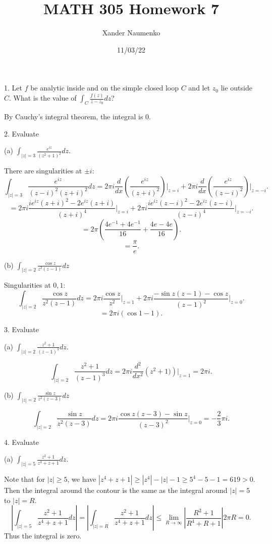 \documentclass[letterpaper, reqno,11pt]{article}
\begin{document}
\title{MATH 305 Homework 7}
\date{11/03/22}
\author{Xander Naumenko}
\maketitle

1. Let $ f$ be analytic inside and on the simple closed loop $C$ and let $z_0$ lie outside $C$. What is the value of $ \int_{C} \frac{f(z)}{ z-z_0 } dz $?

By Cauchy's integral theorem, the integral is $0$. 

\medskip


2. Evaluate

(a) $\int_{|z|=3} \frac{e^{iz}}{ (z^2+1)^2} dz$.   

There are singularities at $\pm i$: 
\[
\int_{|z|=3}\frac{e^{iz}}{(z-i)^2(z+i)^2}dz=2\pi i \frac{d}{dx}\left(\frac{e^{iz}}{(z+i)^2}\right)\bigg|_{z=i}+2\pi i \frac{d}{dx}\left(\frac{e^{iz}}{(z-i)^2}\right)\bigg|_{z=-i}
.\]
\[
=2\pi i \frac{ie^{iz}(z+i)^2-2e^{iz}(z+i)}{(z+i)^{4}}\bigg|_{z=i}+2\pi i  \frac{ie^{iz}(z-i)^2-2e^{iz}(z-i)}{(z-i)^{4}}\bigg|_{z=-i}
.\]
\[
=2\pi \left( \frac{4e^{-1}+4e^{-1}}{16}+\frac{4e-4e}{16} \right)
.\]
\[
=\frac{\pi}{e}
.\]

(b) $ \int_{|z|=2} \frac{ \cos z}{ z^2 (z-1)} dz$

Singularities at $0, 1$: 
 \[
\int_{|z|=2} \frac{\cos z}{z^2(z-1)}dz=2\pi i\frac{\cos z}{z^2}\bigg|_{z=1}+2\pi i \frac{-\sin z (z-1)-\cos z}{(z-1)^2}\bigg|_{z=0}
.\]
\[
=2\pi i\left( \cos 1-1 \right) 
.\]

\medskip


3. Evaluate

(a) $\int_{|z|=2} \frac{z^2+1}{ (z-1)^3} dz$. 

\[
\int_{|z|=2} \frac{z^2+1}{ (z-1)^3} dz=2\pi i\frac{d^2}{dx^2}\left( z^2+1) \right) \bigg|_{z=1}=2\pi i
.\]

(b) $ \int_{|z|=2} \frac{\sin z}{z^2 (z-3)} dz $

\[
\int_{|z|=2} \frac{\sin z}{z^2 (z-3)} dz =2 \pi i\frac{\cos z(z-3)-\sin z}{(z-3)^2}\bigg|_{z=0}=-\frac{2}{3}\pi i
.\]

\medskip

4. Evaluate

(a) $\int_{|z|=5} \frac{ z^2+1}{ z^4+ z+1} dz$. 

Note that for $|z|\geq 5$, we have $\left|z^{4}+z+1\right|\geq|z^{4}|-|z|-1  \geq 5^{4}-5-1=619>0$. Then the integral around the contour is the same as the integral around $|z|=5$ to $|z|=R$. 
 \[
\left|\int_{|z|=5}\frac{z^2+1}{z^{4}+z+1}dz\right|=\left|\int_{|z|=R}\frac{z^2+1}{z^{4}+z+1}dz\right|\leq \lim_{R\to \infty}\left| \frac{R^2+1}{R^{4}+R+1} \right|2\pi R=0
.\]
Thus the integral is zero. 
\end{document}
